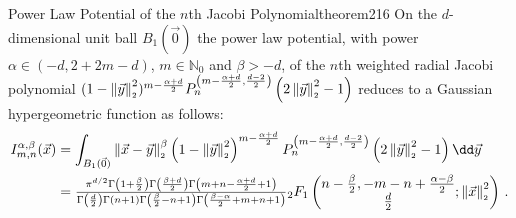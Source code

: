 \begin{theorem}{Power Law Potential of the $n$th Jacobi Polynomial}{theorem216}
  On the $d$-dimensional unit ball $B_1(\vec{0})$ the power law potential, with power $\alpha \in(-d,2+2m-d)$, $m\in\mathbb{N}_0$ and $\beta>-d$, of the $n$th weighted radial Jacobi polynomial $(1-\left\lVert\vec{y}\right\rVert_{\scriptscriptstyle 2}^2)^{m-\frac{\alpha+d}{2}}P_n^{\left(m-\frac{\alpha+d}{2},\frac{d-2}{2}\right)}\left(2 \left\lVert\vec{y}\right\rVert_{\scriptscriptstyle 2}^2 - 1\right)$ reduces to a Gaussian hypergeometric function as follows:
  \begin{align*}
    I_{m,n}^{\alpha,\beta}(\vec{x}) & = \int_{B_1(\vec{0})} \norm{\vec{x}-\vec{y}}^\beta \left(1-\norm{\vec{y}}^2\right)^{m-\frac{\alpha+d}{2}} P_{n}^{\left(m-\frac{\alpha+d}{2},\frac{d-2}{2}\right)}\left(\jacobiarg{y}\right) \dd\vec{y}                                                                                                                                                                                                             \\
                                    & = \tfrac{\pi ^{d/2} \Gamma \left(1+\frac{\beta}{2}\right) \Gamma \left(\frac{\beta+d}{2}\right) \Gamma \left(m+n-\frac{\alpha+d}{2}+1\right)}{\Gamma \left(\frac{d}{2}\right) \Gamma (n+1) \Gamma \left(\frac{\beta}{2}-n+1\right) \Gamma \left(\frac{\beta-\alpha}{2}+m+n+1\right)}{}_2F_1\left(\begin{matrix}n-\frac{\beta}{2}, -m-n+\frac{\alpha-\beta}{2} \\\frac{d}{2}\end{matrix};\norm{\vec{x}}^2\right)\,.
  \end{align*}
\end{theorem}

